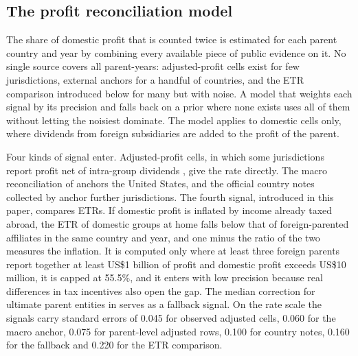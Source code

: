 \documentclass[11pt,a4paper]{article}
\newcommand{\usd}{US\$}
\begin{document}
\subsection{The profit reconciliation model}\label{app:reconciliation}

The share of domestic profit that is counted twice is estimated for each parent country and year by combining every available piece of public evidence on it. No single source covers all parent-years: adjusted-profit cells exist for few jurisdictions, external anchors for a handful of countries, and the ETR comparison introduced below for many but with noise. A model that weights each signal by its precision and falls back on a prior where none exists uses all of them without letting the noisiest dominate. The model applies to domestic cells only, where dividends from foreign subsidiaries are added to the profit of the parent.

Four kinds of signal enter. Adjusted-profit cells, in which some jurisdictions report profit net of intra-group dividends \citep{oecd2025a}, give the rate directly. The macro reconciliation of \citet{garcia-bernardo2022a} anchors the United States, and the official country notes collected by \citet{godar2024} anchor further jurisdictions. The fourth signal, introduced in this paper, compares ETRs. If domestic profit is inflated by income already taxed abroad, the ETR of domestic groups at home falls below that of foreign-parented affiliates in the same country and year, and one minus the ratio of the two measures the inflation. It is computed only where at least three foreign parents report together at least \usd1 billion of profit and domestic profit exceeds \usd10 million, it is capped at 55.5\%, and it enters with low precision because real differences in tax incentives also open the gap. The median correction for ultimate parent entities in \citet{hugger2026} serves as a fallback signal. On the rate scale the signals carry standard errors of 0.045 for observed adjusted cells, 0.060 for the macro anchor, 0.075 for parent-level adjusted rows, 0.100 for country notes, 0.160 for the fallback and 0.220 for the ETR comparison.
\end{document}
